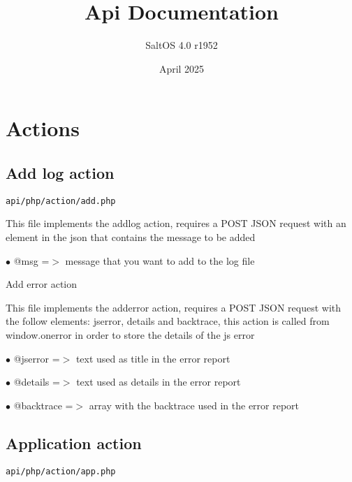 \documentclass[a4paper]{article}
\title{Api Documentation}
\author{SaltOS 4.0 r1952}
\begin{document}
\date{April 2025}
\maketitle
\clearpage

\tableofcontents
\clearpage


\hypertarget{toc1}{}
\section{Actions}

\hypertarget{toc2}{}
\subsection{Add log action}

\begin{lstlisting}
api/php/action/add.php
\end{lstlisting}

This file implements the addlog action, requires a POST JSON request
with an element in the json that contains the message to be added

\begin{compactitem}
\item[\color{myblue}$\bullet$] @msg =$>$ message that you want to add to the log file
\end{compactitem}

Add error action

This file implements the adderror action, requires a POST JSON request
with the follow elements: jserror, details and backtrace, this action
is called from window.onerror in order to store the details of the js
error

\begin{compactitem}
\item[\color{myblue}$\bullet$] @jserror   =$>$ text used as title in the error report
\item[\color{myblue}$\bullet$] @details   =$>$ text used as details in the error report
\item[\color{myblue}$\bullet$] @backtrace =$>$ array with the backtrace used in the error report
\end{compactitem}

\hypertarget{toc3}{}
\subsection{Application action}

\begin{lstlisting}
api/php/action/app.php
\end{lstlisting}
\end{document}
